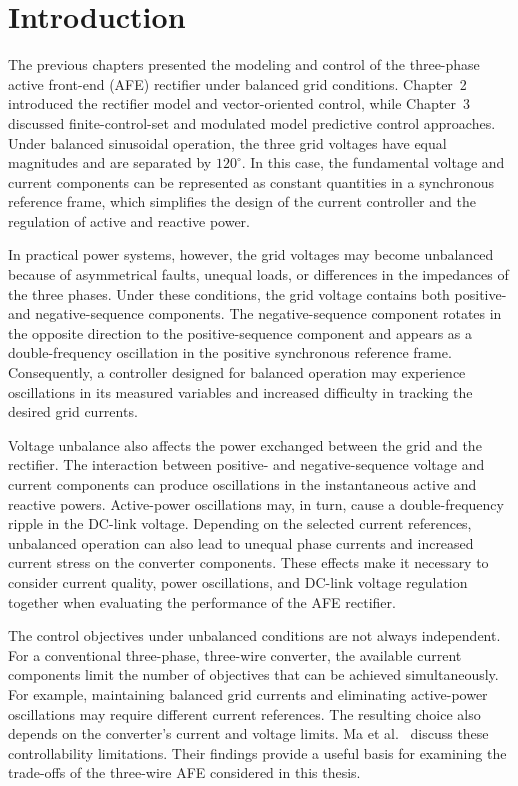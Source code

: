 \label{ch:unbalance}
\section{Introduction}
The previous chapters presented the modeling and control of the three-phase active front-end (AFE) rectifier under balanced grid conditions. Chapter~2 introduced the rectifier model and vector-oriented control, while Chapter~3 discussed finite-control-set and modulated model predictive control approaches. Under balanced sinusoidal operation, the three grid voltages have equal magnitudes and are separated by $120^\circ$. In this case, the fundamental voltage and current components can be represented as constant quantities in a synchronous reference frame, which simplifies the design of the current controller and the regulation of active and reactive power.

In practical power systems, however, the grid voltages may become unbalanced because of asymmetrical faults, unequal loads, or differences in the impedances of the three phases. Under these conditions, the grid voltage contains both positive- and negative-sequence components. The negative-sequence component rotates in the opposite direction to the positive-sequence component and appears as a double-frequency oscillation in the positive synchronous reference frame. Consequently, a controller designed for balanced operation may experience oscillations in its measured variables and increased difficulty in tracking the desired grid currents.

Voltage unbalance also affects the power exchanged between the grid and the rectifier. The interaction between positive- and negative-sequence voltage and current components can produce oscillations in the instantaneous active and reactive powers. Active-power oscillations may, in turn, cause a double-frequency ripple in the DC-link voltage. Depending on the selected current references, unbalanced operation can also lead to unequal phase currents and increased current stress on the converter components. These effects make it necessary to consider current quality, power oscillations, and DC-link voltage regulation together when evaluating the performance of the AFE rectifier.

The control objectives under unbalanced conditions are not always independent. For a conventional three-phase, three-wire converter, the available current components limit the number of objectives that can be achieved simultaneously. For example, maintaining balanced grid currents and eliminating active-power oscillations may require different current references. The resulting choice also depends on the converter's current and voltage limits. Ma et al.~\cite{ma2015} discuss these controllability limitations. Their findings provide a useful basis for examining the trade-offs of the three-wire AFE considered in this thesis.

